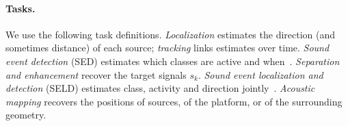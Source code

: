 \paragraph{Tasks.}
We use the following task definitions.
\emph{Localization} estimates the direction (and sometimes distance) of each source; \emph{tracking} links estimates over time.
\emph{Sound event detection} (SED) estimates which classes are active and when~\cite{mesaros2021tutorial}.
\emph{Separation and enhancement} recover the target signals $s_k$.
\emph{Sound event localization and detection} (SELD) estimates class, activity and direction jointly~\cite{adavanne2019seld}.
\emph{Acoustic mapping} recovers the positions of sources, of the platform, or of the surrounding geometry.
